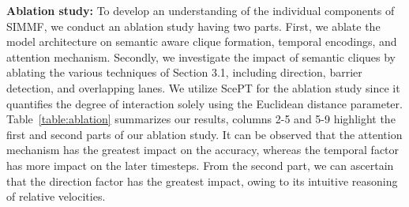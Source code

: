 \documentclass[letterpaper, 10 pt, conference]{ieeeconf}  %
\begin{document}
\textbf{Ablation study:} 
To develop an understanding of the individual components of SIMMF, we conduct an ablation study having two parts. First, we ablate the model architecture on semantic aware clique formation, temporal encodings, and attention mechanism. Secondly, we investigate the impact of semantic cliques by ablating the various techniques of Section 3.1, including direction, barrier detection, and overlapping lanes. We utilize ScePT for the ablation study since it quantifies the degree of interaction solely using the Euclidean distance parameter. Table~\ref{table:ablation} summarizes our results, columns 2-5 and 5-9 highlight the first and second parts of our ablation study. It can be observed that the attention mechanism has the greatest impact on the accuracy, whereas the temporal factor has more impact on the later timesteps. From the second part, we can ascertain that the direction factor has the greatest impact, owing to its intuitive reasoning of relative velocities. 
\end{document}
